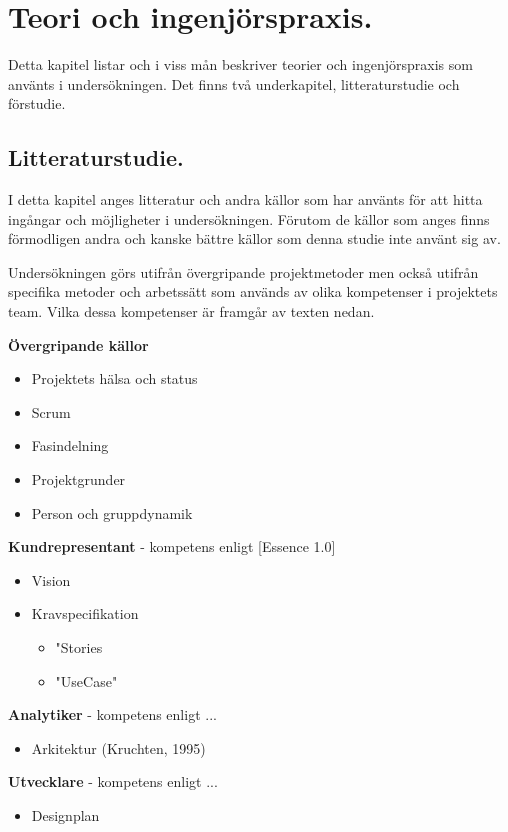 \section{Teori och ingenjörspraxis.}
Detta kapitel listar och i viss mån beskriver teorier och ingenjörspraxis som använts
i undersökningen. Det finns två underkapitel, litteraturstudie och förstudie.

\subsection{Litteraturstudie.}
I detta kapitel anges litteratur och andra källor som har använts för att hitta ingångar
och möjligheter i undersökningen. Förutom de källor som anges finns förmodligen andra 
och kanske bättre källor som denna studie inte använt sig av.

Undersökningen görs utifrån övergripande projektmetoder men också utifrån specifika metoder
och arbetssätt som används av olika kompetenser i projektets team. Vilka dessa kompetenser
är framgår av texten nedan.

\textbf{Övergripande källor}
\begin{itemize}
    \item Projektets hälsa och status
    \item Scrum
    \item Fasindelning
    \item Projektgrunder
    \item Person och gruppdynamik
\end{itemize}

\textbf{Kundrepresentant} - kompetens enligt [Essence 1.0]
\begin{itemize}
    \item Vision
    \item Kravspecifikation
    \begin{itemize}
        \item "Stories
        \item "UseCase"
    \end{itemize}
\end{itemize}

\textbf{Analytiker} - kompetens enligt ...
\begin{itemize}
    \item Arkitektur (Kruchten, 1995)
\end{itemize}

\textbf{Utvecklare} - kompetens enligt ...
\begin{itemize}
    \item Designplan
\end{itemize}

